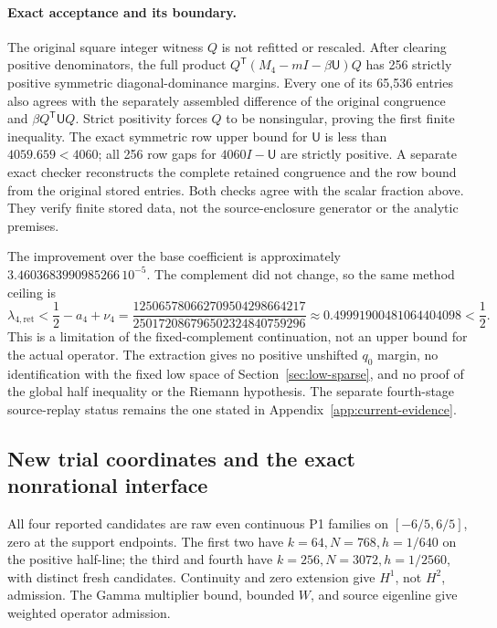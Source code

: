 \documentclass[11pt,a4paper]{article}
\numberwithin{equation}{section}
\theoremstyle{definition}\newtheorem{definition}[theorem]{Definition}
\theoremstyle{remark}\newtheorem{remark}[theorem]{Remark}
\begin{document}
\paragraph{Exact acceptance and its boundary.}
The original square integer witness $Q$ is not refitted or rescaled.
After clearing positive denominators, the full product
$Q^{\mathsf T}(M_4-mI-\beta\mathsf U)Q$ has 256 strictly positive
symmetric diagonal-dominance margins. Every one of its 65,536 entries
also agrees with the separately assembled difference of the original
congruence and $\beta Q^{\mathsf T}\mathsf UQ$. Strict positivity forces
$Q$ to be nonsingular, proving the first finite inequality. The exact
symmetric row upper bound for $\mathsf U$ is less than
$4059.659<4060$; all 256 row gaps for $4060I-\mathsf U$ are strictly
positive. A separate exact checker reconstructs the complete retained
congruence and the row bound from the original stored entries. Both
checks agree with the scalar fraction above. They verify finite stored
data, not the source-enclosure generator or the analytic premises.

The improvement over the base coefficient is approximately
$3.4603683990985266\,10^{-5}$. The complement did not change, so the same
method ceiling is
\[
 \lambda_{4,\mathrm{ret}}<\frac12-a_4+\nu_4
 =\frac{125065780662709504298664217}{250172086796502324840759296}
 \approx0.49991900481064404098<\frac12.
\]
This is a limitation of the fixed-complement continuation, not an upper
bound for the actual operator. The extraction gives no positive
unshifted $q_0$ margin, no identification with the fixed low space of
Section~\ref{sec:low-sparse}, and no proof of the global half inequality
or the Riemann hypothesis. The separate fourth-stage source-replay
status remains the one stated in Appendix~\ref{app:current-evidence}.


\subsection{New trial coordinates and the exact nonrational interface}\label{vrg:sec:interface}
All four reported candidates are raw even continuous P1 families on
\([-6/5,6/5]\), zero at the support endpoints. The first two have
\(k=64,N=768,h=1/640\) on the positive half-line; the third and fourth have
\(k=256,N=3072,h=1/2560\), with distinct fresh candidates. Continuity and zero extension give \(H^1\),
not \(H^2\), admission. The Gamma multiplier bound, bounded \(W\), and
source eigenline give weighted operator admission.
\end{document}
